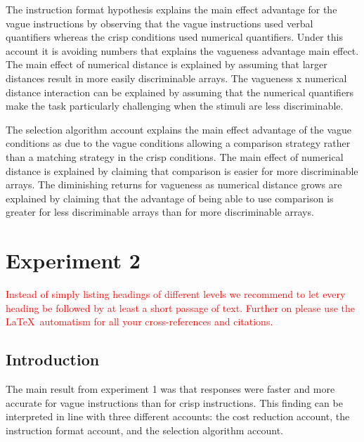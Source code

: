 \documentclass[graybox,envcountchap,sectrefs%
,footinfo
]{svmono}
\begin{document}
The instruction format hypothesis explains the main effect advantage for the vague instructions by observing that the vague instructions used verbal quantifiers whereas the crisp conditions used numerical quantifiers. Under this account it is avoiding numbers that explains the vagueness advantage main effect. The main effect of numerical distance is explained by assuming that larger distances result in more easily discriminable arrays. The vagueness x numerical distance interaction can be explained by assuming that the numerical quantifiers make the task particularly challenging when the stimuli are less discriminable.

The selection algorithm account explains the main effect advantage of the vague conditions as due to the vague conditions allowing a comparison strategy rather than a matching strategy in the crisp conditions. The main effect of numerical distance is explained by claiming that comparison is easier for more discriminable arrays. The diminishing returns for vagueness as numerical distance grows are explained by claiming that the advantage of being able to use comparison is greater for less discriminable arrays than for more discriminable arrays.

\FloatBarrier
\section{Experiment 2}
\label{sec:3}
\textcolor{red}{Instead of simply listing headings of different levels we recommend to let every heading be followed by at least a short passage of text. Further on please use the \LaTeX\ automatism for all your cross-references and citations.}


\subsection{Introduction}

The main result from experiment 1 was that responses were faster and more accurate for vague instructions than for crisp instructions. This finding can be interpreted in line with three different accounts: the cost reduction account, the instruction format account, and the selection algorithm account. 
\end{document}
